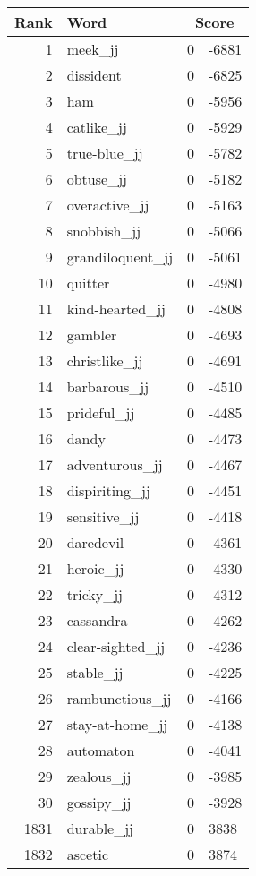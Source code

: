 \begin{longtable}[!htbp]{| rlr@{.}l |}
    \hline
    \textbf{Rank} & \textbf{Word} & \multicolumn{2}{c|}{\textbf{Score}} \\
    \hline
    \endhead
    1 & meek\_jj & 0 & -6881 \\
    2 & dissident & 0 & -6825 \\
    3 & ham & 0 & -5956 \\
    4 & catlike\_jj & 0 & -5929 \\
    5 & true-blue\_jj & 0 & -5782 \\
    6 & obtuse\_jj & 0 & -5182 \\
    7 & overactive\_jj & 0 & -5163 \\
    8 & snobbish\_jj & 0 & -5066 \\
    9 & grandiloquent\_jj & 0 & -5061 \\
    10 & quitter & 0 & -4980 \\
    11 & kind-hearted\_jj & 0 & -4808 \\
    12 & gambler & 0 & -4693 \\
    13 & christlike\_jj & 0 & -4691 \\
    14 & barbarous\_jj & 0 & -4510 \\
    15 & prideful\_jj & 0 & -4485 \\
    16 & dandy & 0 & -4473 \\
    17 & adventurous\_jj & 0 & -4467 \\
    18 & dispiriting\_jj & 0 & -4451 \\
    19 & sensitive\_jj & 0 & -4418 \\
    20 & daredevil & 0 & -4361 \\
    21 & heroic\_jj & 0 & -4330 \\
    22 & tricky\_jj & 0 & -4312 \\
    23 & cassandra & 0 & -4262 \\
    24 & clear-sighted\_jj & 0 & -4236 \\
    25 & stable\_jj & 0 & -4225 \\
    26 & rambunctious\_jj & 0 & -4166 \\
    27 & stay-at-home\_jj & 0 & -4138 \\
    28 & automaton & 0 & -4041 \\
    29 & zealous\_jj & 0 & -3985 \\
    30 & gossipy\_jj & 0 & -3928 \\
    1831 & durable\_jj & 0 & 3838 \\
    1832 & ascetic & 0 & 3874 \\

\end{longtable}
